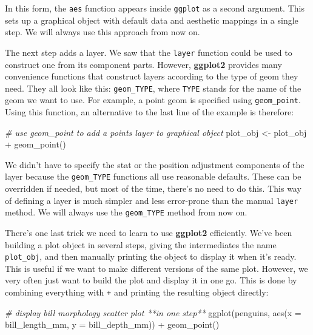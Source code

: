 \documentclass[
]{book}
\newenvironment{Shaded}{\begin{snugshade}}{\end{snugshade}}
\newcommand{\AttributeTok}[1]{\textcolor[rgb]{0.77,0.63,0.00}{#1}}
\newcommand{\CommentTok}[1]{\textcolor[rgb]{0.56,0.35,0.01}{\textit{#1}}}
\newcommand{\FunctionTok}[1]{\textcolor[rgb]{0.00,0.00,0.00}{#1}}
\newcommand{\NormalTok}[1]{#1}
\newcommand{\OtherTok}[1]{\textcolor[rgb]{0.56,0.35,0.01}{#1}}
\newcommand{\SpecialCharTok}[1]{\textcolor[rgb]{0.00,0.00,0.00}{#1}}
\begin{document}
In this form, the \texttt{aes} function appears inside \texttt{ggplot} as a second argument. This sets up a graphical object with default data and aesthetic mappings in a single step. We will always use this approach from now on.

The next step adds a layer. We saw that the \texttt{layer} function could be used to construct one from its component parts. However, \textbf{ggplot2} provides many convenience functions that construct layers according to the type of geom they need. They all look like this: \texttt{geom\_TYPE}, where \texttt{TYPE} stands for the name of the geom we want to use. For example, a point geom is specified using \texttt{geom\_point}. Using this function, an alternative to the last line of the example is therefore:

\begin{Shaded}
\begin{Highlighting}[]
\CommentTok{\# use geom\_point to add a points layer to graphical object}
\NormalTok{plot\_obj }\OtherTok{\textless{}{-}}\NormalTok{ plot\_obj }\SpecialCharTok{+} \FunctionTok{geom\_point}\NormalTok{()}
\end{Highlighting}
\end{Shaded}

We didn't have to specify the stat or the position adjustment components of the layer because the \texttt{geom\_TYPE} functions all use reasonable defaults. These can be overridden if needed, but most of the time, there's no need to do this. This way of defining a layer is much simpler and less error-prone than the manual \texttt{layer} method. We will always use the \texttt{geom\_TYPE} method from now on.

There's one last trick we need to learn to use \textbf{ggplot2} efficiently. We've been building a plot object in several steps, giving the intermediates the name \texttt{plot\_obj}, and then manually printing the object to display it when it's ready. This is useful if we want to make different versions of the same plot. However, we very often just want to build the plot and display it in one go. This is done by combining everything with \texttt{+} and printing the resulting object directly:

\begin{Shaded}
\begin{Highlighting}[]
\CommentTok{\# display bill morphology scatter plot **in one step**}
\FunctionTok{ggplot}\NormalTok{(penguins, }
       \FunctionTok{aes}\NormalTok{(}\AttributeTok{x =}\NormalTok{ bill\_length\_mm, }\AttributeTok{y =}\NormalTok{ bill\_depth\_mm)) }\SpecialCharTok{+} 
  \FunctionTok{geom\_point}\NormalTok{()}
\end{Highlighting}
\end{Shaded}
\end{document}
